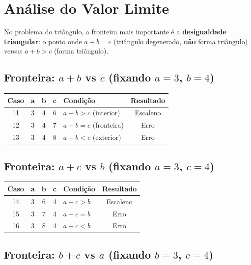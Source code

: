 \documentclass[12pt,a4paper]{article}
\begin{document}
\section{Análise do Valor Limite}

No problema do triângulo, a fronteira mais importante é a \textbf{desigualdade triangular}: o ponto onde $a + b = c$ (triângulo degenerado, \textbf{não} forma triângulo) versus $a + b > c$ (forma triângulo).

\subsection{Fronteira: $a + b$ vs $c$ \quad (fixando $a = 3$, $b = 4$)}

\begin{center}
\begin{tabular}{cccclc}
\toprule
\textbf{Caso} & \textbf{a} & \textbf{b} & \textbf{c} & \textbf{Condição} & \textbf{Resultado} \\
\midrule
11 & 3 & 4 & 6 & $a + b > c$ (interior) & Escaleno \\
12 & 3 & 4 & 7 & $a + b = c$ (fronteira) & Erro \\
13 & 3 & 4 & 8 & $a + b < c$ (exterior) & Erro \\
\bottomrule
\end{tabular}
\end{center}

\subsection{Fronteira: $a + c$ vs $b$ \quad (fixando $a = 3$, $c = 4$)}

\begin{center}
\begin{tabular}{cccclc}
\toprule
\textbf{Caso} & \textbf{a} & \textbf{b} & \textbf{c} & \textbf{Condição} & \textbf{Resultado} \\
\midrule
14 & 3 & 6 & 4 & $a + c > b$ & Escaleno \\
15 & 3 & 7 & 4 & $a + c = b$ & Erro \\
16 & 3 & 8 & 4 & $a + c < b$ & Erro \\
\bottomrule
\end{tabular}
\end{center}

\subsection{Fronteira: $b + c$ vs $a$ \quad (fixando $b = 3$, $c = 4$)}
\end{document}
